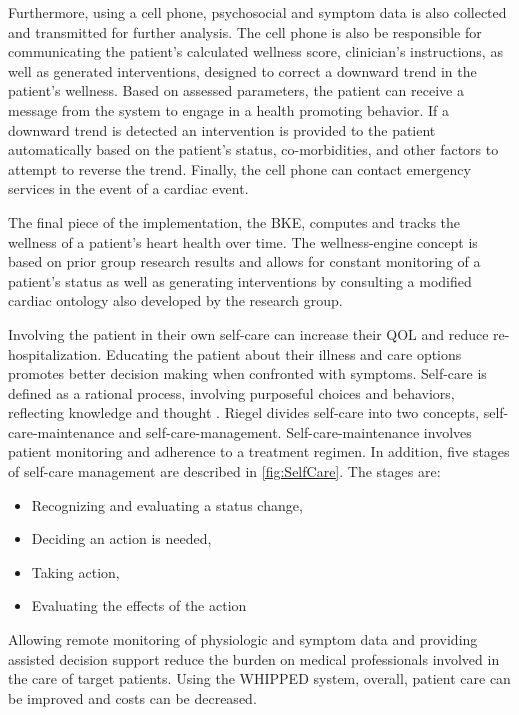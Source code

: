 Furthermore, using a cell phone, psychosocial and symptom data is also collected and transmitted for further analysis. The cell phone is also be responsible for communicating the patient's calculated wellness score, clinician's instructions, as well as generated interventions, designed to correct a downward trend in the patient's wellness.  Based on assessed parameters, the patient can receive a message from the system to engage in a health promoting behavior. If a downward trend is detected an intervention is provided to the patient automatically based on the patient's status, co-morbidities, and other factors to attempt to reverse the trend. Finally, the cell phone can contact emergency services in the event of a cardiac event.

The final piece of the implementation, the BKE, computes and tracks the wellness of a patient's heart health over time. The wellness-engine concept is based on prior group research results \cite{Chaiyasucheeva2012} and allows for constant monitoring of a patient's status as well as generating interventions by consulting a modified cardiac ontology also developed by the research group.

Involving the patient in their own self-care can increase their QOL and reduce re-hospitalization. Educating the patient about their illness and care options promotes better decision making when confronted with symptoms.  Self-care is defined as a rational process, involving purposeful choices and behaviors, reflecting knowledge and thought \cite{Riegel2008}. Riegel divides self-care into two concepts, self-care-maintenance and self-care-management.  Self-care-maintenance involves patient monitoring and adherence to a treatment regimen.  In addition, five stages of self-care management are described in \cref{fig:SelfCare}\cite{Riegel2008}. The stages are:
\begin{itemize}
\item  Recognizing and evaluating a status change, 
\item  Deciding an action is needed, 
\item  Taking action, 
\item  Evaluating the effects of the action
\end{itemize}
 Allowing remote monitoring of physiologic and symptom data and providing assisted decision support reduce the burden on medical professionals involved in the care of target patients. Using the WHIPPED system, overall, patient care can be improved and costs can be decreased. 

